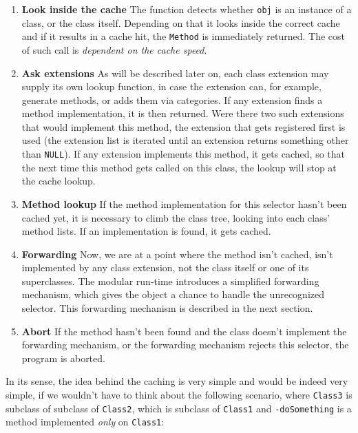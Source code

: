 \begin{enumerate}
  \item{\bf{Look inside the cache}} The function detects whether \verb=obj= is an instance of a class, or the class itself. Depending on that it looks inside the correct cache and if it results in a cache hit, the \verb=Method= is immediately returned. The cost of such call is \emph{dependent on the cache speed}.
  \item{\bf{Ask extensions}} As will be described later on, each class extension may supply its own lookup function, in case the extension can, for example, generate methods, or adds them via categories. If any extension finds a method implementation, it is then returned. Were there two such extensions that would implement this method, the extension that gets registered first is used (the extension list is iterated until an extension returns something other than \verb=NULL=). If any extension implements this method, it gets cached, so that the next time this method gets called on this class, the lookup will stop at the cache lookup.
  \item{\bf{Method lookup}} If the method implementation for this selector hasn't been cached yet, it is necessary to climb the class tree, looking into each class' method lists. If an implementation is found, it gets cached.
  \item{\bf{Forwarding}} Now, we are at a point where the method isn't cached, isn't implemented by any class extension, not the class itself or one of its superclasses. The modular run-time introduces a simplified forwarding mechanism, which gives the object a chance to handle the unrecognized selector. This forwarding mechanism is described in the next section.
  \item{\bf{Abort}} If the method hasn't been found and the class doesn't implement the forwarding mechanism, or the forwarding mechanism rejects this selector, the program is aborted.
\end{enumerate}

In its sense, the idea behind the caching is very simple and would be indeed very simple, if we wouldn't have to think about the following scenario, where \verb=Class3= is subclass of subclass of \verb=Class2=, which is subclass of \verb=Class1= and \verb=-doSomething= is a method implemented \emph{only} on \verb=Class1=:

